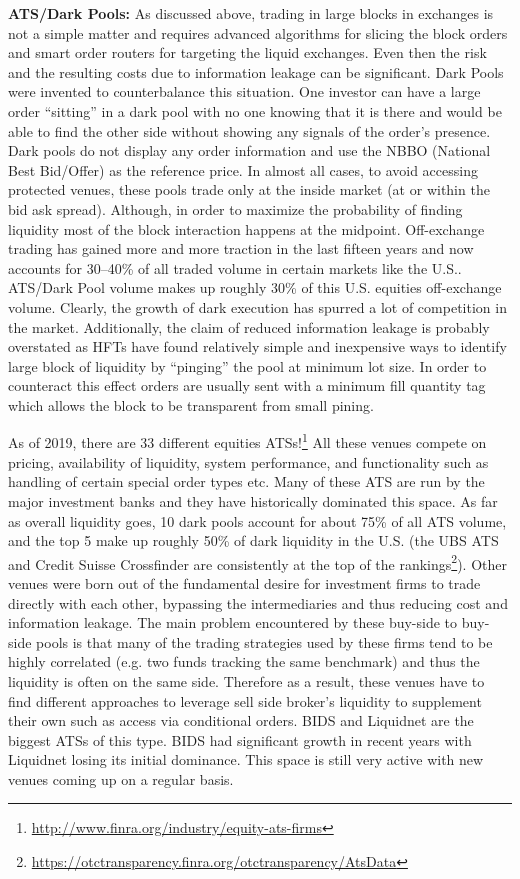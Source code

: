 \noindent\textbf{ATS/Dark Pools:} As discussed above, trading in large blocks in exchanges is not a simple matter and requires advanced algorithms for slicing the block orders and smart order routers for targeting the liquid exchanges. Even then the risk and the resulting costs due to information leakage can be significant. Dark Pools were invented to counterbalance this situation. One investor can have a large order ``sitting'' in a dark pool with no one knowing that it is there and would be able to find the other side without showing any signals of the order's presence. Dark pools do not display any order information and use the NBBO (National Best Bid/Offer) as the reference price. In almost all cases, to avoid accessing protected venues, these pools trade only at the inside market (at or within the bid ask spread). Although, in order to maximize the probability of finding liquidity most of the block interaction happens at the midpoint. Off-exchange trading has gained more and more traction in the last fifteen years and now accounts for 30--40\% of all traded volume in certain markets like the U.S.. ATS/Dark Pool volume makes up roughly 30\% of this U.S. equities off-exchange volume. Clearly, the growth of dark execution has spurred a lot of competition in the market. Additionally, the claim of reduced information leakage is probably overstated as HFTs have found relatively simple and inexpensive ways to identify large block of liquidity by ``pinging'' the pool at minimum lot size. In order to counteract this effect orders are usually sent with a minimum fill quantity tag which allows the block to be transparent from small pining.


As of 2019, there are 33 different equities ATSs!\footnote{\url{http://www.finra.org/industry/equity-ats-firms}} All these venues compete on pricing, availability of liquidity, system performance, and functionality such as handling of certain special order types etc. Many of these ATS are run by the major investment banks and they have historically dominated this space. As far as overall liquidity goes, 10 dark pools account for about 75\% of all ATS volume, and the top 5 make up roughly 50\% of dark liquidity in the U.S. (the UBS ATS and Credit Suisse Crossfinder are consistently at the top of the rankings\footnote{\url{https://otctransparency.finra.org/otctransparency/AtsData}}). Other venues were born out of the fundamental desire for investment firms to trade directly with each other, bypassing the intermediaries and thus reducing cost and information leakage.  The main problem encountered by these buy-side to buy-side pools is that many of the trading strategies used by these firms tend to be highly correlated (e.g. two funds tracking the same benchmark) and thus the liquidity is often on the same side. Therefore as a result, these venues have to find different approaches to leverage sell side broker's liquidity to supplement their own such as access via conditional orders. BIDS and Liquidnet are the biggest ATSs of this type. BIDS had significant growth in recent years with Liquidnet losing its initial dominance. This space is still very active with new venues coming up on a regular basis. \twomedskip


